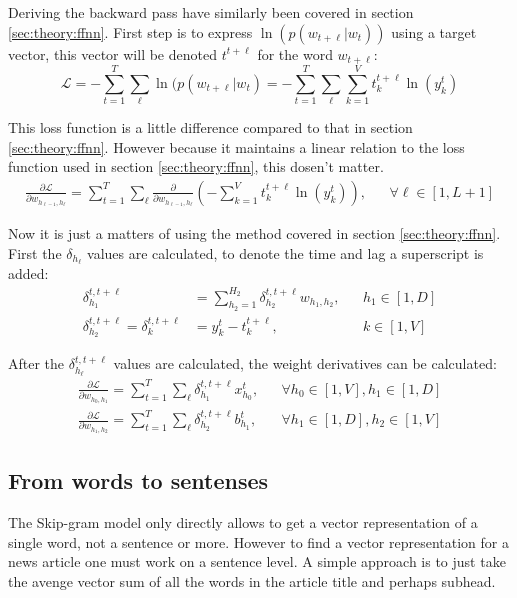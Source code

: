 Deriving the backward pass have similarly been covered in section \ref{sec:theory:ffnn}. First step is to express $\ln( p(w_{t + \ell} | w_t) )$ using a target vector, this vector will be denoted $t^{t+\ell}$ for the word $w_{t + \ell}$:
\begin{equation}
\mathcal{L} =  - \sum_{t = 1}^T \sum_{\ell} \ln( p(w_{t + \ell} | w_t) =  - \sum_{t = 1}^T \sum_{\ell} \sum_{k=1}^V t_k^{t+\ell} \ln(y_k^t)
\end{equation}

This loss function is a little difference compared to that in section \ref{sec:theory:ffnn}. However because it maintains a linear relation to the loss function used in section \ref{sec:theory:ffnn}, this dosen't matter.
\begin{equation}
\begin{aligned}
\frac{\partial \mathcal{L}}{\partial w_{h_{\ell-1}, h_\ell}} = \sum_{t = 1}^T \sum_{\ell} \frac{\partial}{\partial w_{h_{\ell-1}, h_\ell}} \left(- \sum_{k=1}^V t_k^{t+\ell} \ln(y_k^t)\right), && \forall \ell \in [1, L + 1]
\end{aligned}
\end{equation}

Now it is just a matters of using the method covered in section \ref{sec:theory:ffnn}. First the $\delta_{h_\ell}$ values are calculated, to denote the time and lag a superscript is added:
\begin{equation}
\begin{aligned}
\delta_{h_1}^{t, t + \ell} &= \sum_{h_2=1}^{H_2} \delta_{h_2}^{t, t + \ell} w_{h_1, h_2}, && h_1 \in [1, D] \\
\delta_{h_2}^{t, t + \ell} = \delta_{k}^{t, t + \ell} &= y_k^t - t_k^{t+\ell}, && k \in [1, V]
\end{aligned}
\end{equation}

After the $\delta_{h_\ell}^{t, t+\ell}$ values are calculated, the weight derivatives can be calculated:
\begin{equation}
\begin{aligned}
\frac{\partial \mathcal{L}}{\partial w_{h_{0}, h_1}}= \sum_{t = 1}^T \sum_{\ell} \delta_{h_1}^{t, t + \ell} x_{h_0}^t, && \forall h_0 \in [1, V], h_1 \in [1, D] \\
\frac{\partial \mathcal{L}}{\partial w_{h_{1}, h_2}}= \sum_{t = 1}^T \sum_{\ell} \delta_{h_2}^{t, t + \ell} b_{h_1}^t, && \forall h_1 \in [1, D], h_2 \in [1, V]
\end{aligned}
\end{equation}

\subsection{From words to sentenses}
The Skip-gram model only directly allows to get a vector representation of a single word, not a sentence or more. However to find a vector representation for a news article one must work on a sentence level. A simple approach is to just take the avenge vector sum of all the words in the article title and perhaps subhead.
